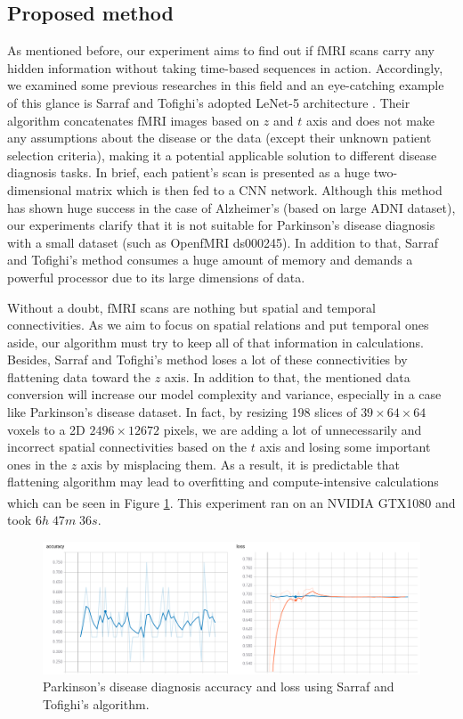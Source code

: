 \documentclass[a4paper,fleqn]{cas-dc}
\begin{document}
\subsection{Proposed method}
\label{section:proposedMethod}
As mentioned before, our experiment aims to find out if fMRI scans carry any hidden information without taking time-based sequences in action. Accordingly, we examined some previous researches in this field and an eye-catching example of this glance is Sarraf and Tofighi's adopted LeNet-5 architecture \cite{Sarraf2016}. Their algorithm concatenates fMRI images based on $z$ and $t$ axis and does not make any assumptions about the disease or the data (except their unknown patient selection criteria), making it a potential applicable solution to different disease diagnosis tasks. In brief, each patient's scan is presented as a huge two-dimensional matrix which is then fed to a CNN network. Although this method has shown huge success in the case of Alzheimer's (based on large ADNI dataset), our experiments clarify that it is not suitable for Parkinson's disease diagnosis with a small dataset (such as OpenfMRI ds000245). In addition to that, Sarraf and Tofighi's method consumes a huge amount of memory and demands a powerful processor due to its large dimensions of data.

Without a doubt, fMRI scans are nothing but spatial and temporal connectivities. As we aim to focus on spatial relations and put temporal ones aside, our algorithm must try to keep all of that information in calculations. Besides, Sarraf and Tofighi's method loses a lot of these connectivities by flattening data toward the $z$ axis. In addition to that, the mentioned data conversion will increase our model complexity and variance, especially in a case like Parkinson's disease dataset. In fact, by resizing 198 slices of $39 \times 64 \times 64$ voxels to a 2D $2496 \times 12672$ pixels, we are adding a lot of unnecessarily and incorrect spatial connectivities based on the $t$ axis and losing some important ones in the $z$ axis by misplacing them. As a result, it is predictable that flattening algorithm may lead to overfitting and compute-intensive calculations which can be seen in Figure \ref{fig:SarrafParkinsonTestResult}. This experiment ran on an NVIDIA\textsuperscript{\tiny\textregistered} GTX1080 and took $6h \; 47m \; 36s$.


\begin{figure}
	\includegraphics[width=\linewidth]{images/SarrafParkinsonTestResult}
	\caption{Parkinson's disease diagnosis accuracy and loss using Sarraf and Tofighi's algorithm.}
	\label{fig:SarrafParkinsonTestResult}
\end{figure}
\end{document}
